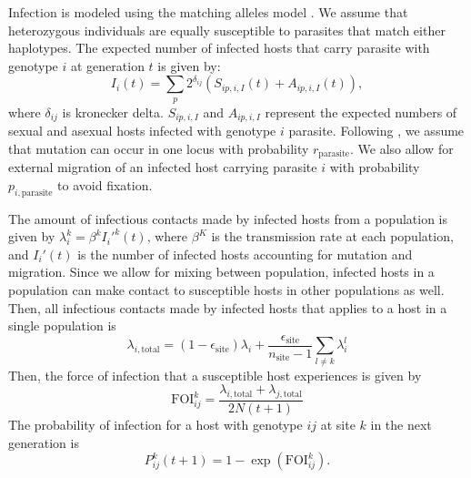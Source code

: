 \documentclass{article}\usepackage[]{graphicx}\usepackage[]{color}
\begin{document}
Infection is modeled using the matching alleles model \citep{otto1998evolution}.
We assume that heterozygous individuals are equally susceptible to parasites that match either haplotypes.
The expected number of infected hosts that carry parasite with genotype $i$ at generation $t$ is given by:
\begin{equation}
I_{i}(t) = \sum_{p} 2^{\delta_{ij}} \left( S_{ip,i,I}(t) + A_{ip,i,I}(t)\right),
\end{equation}
where $\delta_{ij}$ is kronecker delta.
$S_{ip,i,I}$ and $A_{ip,i,I}$ represent the expected numbers of sexual and asexual hosts infected with genotype $i$ parasite. 
Following \cite{ashby2015diversity}, we assume that mutation can occur in one locus with probability $r_{\textrm{parasite}}$. 
We also allow for external migration of an infected host carrying parasite $i$ with probability $p_{i, \textrm{parasite}}$ to avoid fixation.

The amount of infectious contacts made by infected hosts from a population is given by $\lambda_i^k = \beta^k {I_i'}^k(t)$, where $\beta^K$ is the transmission rate at each population, and $I_i'(t)$ is the number of infected hosts accounting for mutation and migration.  
Since we allow for mixing between population, infected hosts in a population can make contact to susceptible hosts in other populations as well.
Then, all infectious contacts made by infected hosts that applies to a host in a single population is
\begin{equation}
\lambda_{i, \textrm{total}} = (1 - \epsilon_{\textrm{site}}) \lambda_i + \frac{\epsilon_{\textrm{site}}}{n_\textrm{site}-1} \sum_{l \neq k} \lambda_i^l
\end{equation}
Then, the force of infection that a susceptible host experiences is given by
\begin{equation}
\mathrm{FOI}_{ij}^k = \frac{\lambda_{i, \textrm{total}}  + \lambda_{j, \textrm{total}}  }{2 N(t+1)}
\end{equation}
The probability of infection for a host with genotype $ij$ at site $k$ in the next generation is
\begin{equation}
P_{ij}^k(t+1) = 1 - \exp\left(\mathrm{FOI}_{ij}^k\right).
\end{equation}
\end{document}

